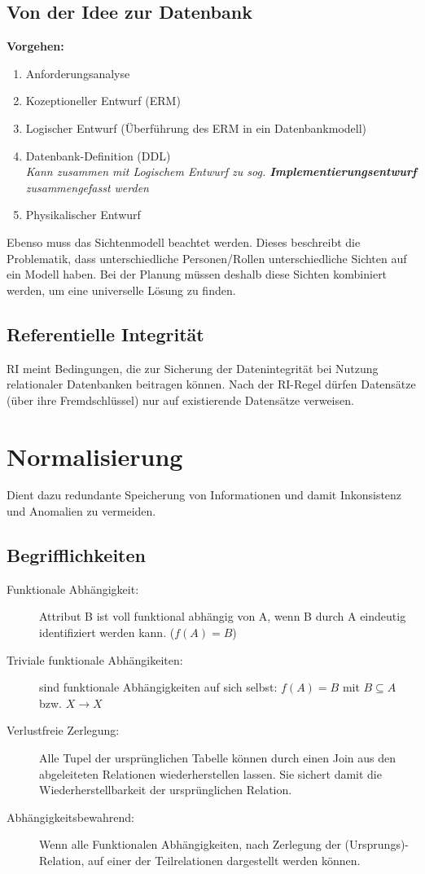 \documentclass[12pt,a4paper]{article}
\begin{document}
	\subsection{Von der Idee zur Datenbank}
		\textbf{Vorgehen:}
		\begin{enumerate}
			\item Anforderungsanalyse
			\item Kozeptioneller Entwurf (ERM)
			\item Logischer Entwurf (Überführung des ERM in ein Datenbankmodell)
			\item Datenbank-Definition (DDL)\\ \textit{Kann zusammen mit Logischem Entwurf zu sog. \textbf{Implementierungsentwurf} zusammengefasst werden}
			\item Physikalischer Entwurf
		\end{enumerate}
		Ebenso muss das Sichtenmodell beachtet werden. Dieses beschreibt die Problematik, dass unterschiedliche Personen/Rollen unterschiedliche Sichten auf ein Modell haben. Bei der Planung müssen deshalb diese Sichten kombiniert werden, um eine universelle Lösung zu finden.

	\subsection{Referentielle Integrität}
		RI meint Bedingungen, die zur Sicherung der Datenintegrität bei Nutzung relationaler Datenbanken beitragen können. Nach der RI-Regel dürfen Datensätze (über ihre Fremdschlüssel) nur auf existierende Datensätze verweisen.

\section{Normalisierung}
	Dient dazu redundante Speicherung von Informationen und damit Inkonsistenz und Anomalien zu vermeiden.
	\subsection{Begrifflichkeiten}
		\begin{description}
			\item[Funktionale Abhängigkeit:] Attribut B ist voll funktional abhängig von A, wenn B durch A eindeutig identifiziert werden kann. ($f(A)=B$)
			\item[Triviale funktionale Abhängikeiten:] sind funktionale Abhängigkeiten auf sich selbst: $f(A)=B$ mit $B \subseteq A$ bzw. $X \rightarrow X$ 
			\item[Verlustfreie Zerlegung:] Alle Tupel der ursprünglichen Tabelle können durch einen Join aus den abgeleiteten Relationen wiederherstellen lassen. 
			Sie sichert damit die Wiederherstellbarkeit der ursprünglichen Relation.
			\item[Abhängigkeitsbewahrend:] Wenn alle Funktionalen Abhängigkeiten, nach Zerlegung der (Ursprungs)-Relation, auf einer der Teilrelationen dargestellt werden können.
		\end{description}
\end{document}
